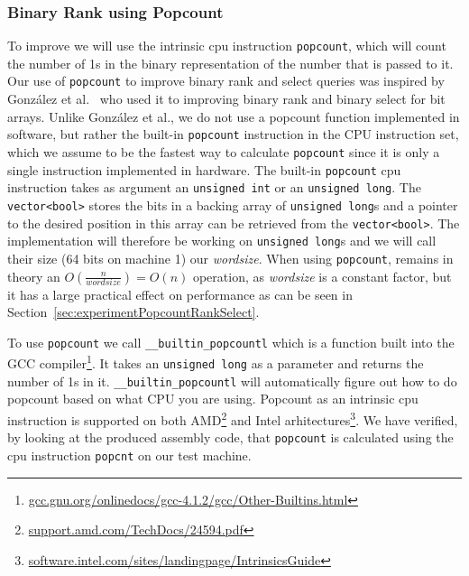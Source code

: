 \subsubsection{Binary Rank using Popcount}
\label{sec:popcountBinaryRank}
To improve  we will use the intrinsic cpu instruction \texttt{popcount}, which will count the number of 1s in the binary representation of the number that is passed to it.
Our use of \texttt{popcount} to improve binary rank and select queries was inspired by~ González et al.~ who used it to improving binary rank and binary select for bit arrays.
Unlike González et al., we do not use a popcount function implemented in software, but rather the built-in \texttt{popcount} instruction in the CPU instruction set, which we assume to be the fastest way to calculate \texttt{popcount} since it is only a single instruction implemented in hardware.
The built-in \texttt{popcount} cpu instruction takes as argument an \texttt{unsigned int} or an \texttt{unsigned long}.
The \texttt{vector<bool>} stores the bits in a backing array of \texttt{unsigned long}s and a pointer to the desired position in this array can be retrieved from the \texttt{vector<bool>}.
The implementation will therefore be working on \texttt{unsigned long}s and we will call their size (64 bits on machine 1) our \textit{wordsize}.
When using \texttt{popcount},  remains in theory an $O(\frac{n}{\mathit{wordsize}}) = O(n)$ operation, as \textit{wordsize} is a constant factor, but it has a large practical effect on performance as can be seen in Section~\ref{sec:experimentPopcountRankSelect}.

To use \texttt{popcount} we call \texttt{\_\_builtin\_popcountl} which is a function built into the GCC compiler\footnote{\url{gcc.gnu.org/onlinedocs/gcc-4.1.2/gcc/Other-Builtins.html}}. 
It takes an \texttt{unsigned long} as a parameter and returns the number of 1s in it. \texttt{\_\_builtin\_popcountl} will automatically figure out how to do popcount based on what CPU you are using. Popcount as an intrinsic cpu instruction is supported on both AMD\footnote{\url{support.amd.com/TechDocs/24594.pdf}} and Intel arhitectures\footnote{\url{software.intel.com/sites/landingpage/IntrinsicsGuide}}.
We have verified, by looking at the produced assembly code, that \texttt{popcount} is calculated using the cpu instruction \texttt{popcnt} on our test machine.
	
